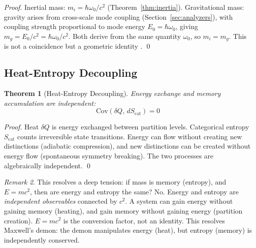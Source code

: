 \documentclass[twocolumn,10pt,a4paper]{article}
\newtheorem{theorem}{Theorem}[section]
\theoremstyle{definition}
\theoremstyle{remark}
\newtheorem{remark}[theorem]{Remark}
\begin{document}
\begin{proof}
Inertial mass: $m_i = \hbar\omega_0/c^2$ (Theorem~\ref{thm:inertia}). Gravitational mass: gravity arises from cross-scale mode coupling (Section~\ref{sec:analyzers}), with coupling strength proportional to mode energy $E_0 = \hbar\omega_0$, giving $m_g = E_0/c^2 = \hbar\omega_0/c^2$. Both derive from the same quantity $\omega_0$, so $m_i = m_g$. This is not a coincidence but a geometric identity \citep{eotvos1922,schlamminger2008}. \qed
\end{proof}

\subsection{Heat-Entropy Decoupling}

\begin{theorem}[Heat-Entropy Decoupling]
\label{thm:decoupling}
Energy exchange and memory accumulation are independent:
\begin{equation}
    \text{Cov}(\delta Q, \, dS_{\text{cat}}) = 0
\end{equation}
\end{theorem}

\begin{proof}
Heat $\delta Q$ is energy exchanged between partition levels. Categorical entropy $S_{\text{cat}}$ counts irreversible state transitions. Energy can flow without creating new distinctions (adiabatic compression), and new distinctions can be created without energy flow (spontaneous symmetry breaking). The two processes are algebraically independent. \qed
\end{proof}

\begin{remark}
This resolves a deep tension: if mass is memory (entropy), and $E = mc^2$, then are energy and entropy the same? No. Energy and entropy are \emph{independent observables} connected by $c^2$. A system can gain energy without gaining memory (heating), and gain memory without gaining energy (partition creation). $E = mc^2$ is the conversion factor, not an identity. This resolves Maxwell's demon: the demon manipulates energy (heat), but entropy (memory) is independently conserved.
\end{remark}
\end{document}
